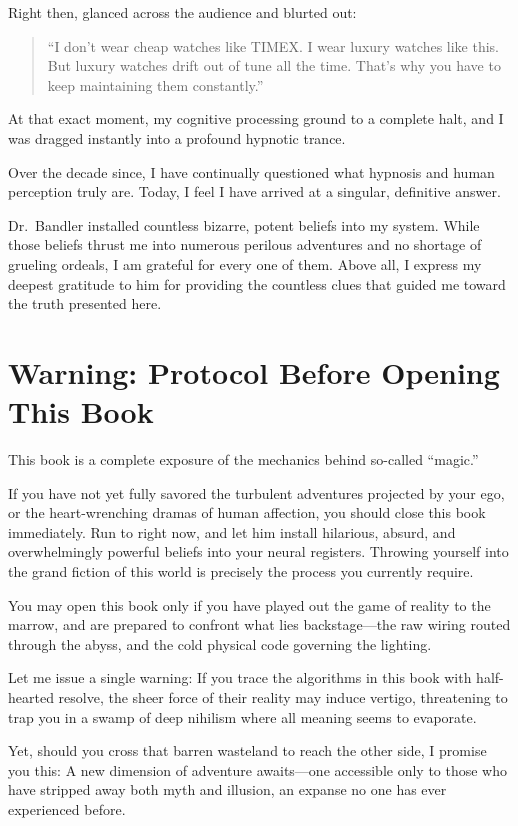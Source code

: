    Right then, \txtBandler glanced across the audience and blurted out:
    \begin{quote}
        ``I don't wear cheap watches like TIMEX. I wear luxury watches like this. But luxury watches drift out of tune all the time. That's why you have to keep maintaining them constantly.''
    \end{quote}

    At that exact moment, my cognitive processing ground to a complete halt, and I was dragged instantly into a profound hypnotic trance.

    Over the decade since, I have continually questioned what hypnosis and human perception truly are. Today, I feel I have arrived at a singular, definitive answer.

    Dr.~Bandler installed countless bizarre, potent beliefs into my system. While those beliefs thrust me into numerous perilous adventures and no shortage of grueling ordeals, I am grateful for every one of them. Above all, I express my deepest gratitude to him for providing the countless clues that guided me toward the truth presented here.

    \section*{Warning: Protocol Before Opening This Book}
    This book is a complete exposure of the mechanics behind so-called ``magic.''

    If you have not yet fully savored the turbulent adventures projected by your ego, or the heart-wrenching dramas of human affection, you should close this book immediately. Run to \fullBandler right now, and let him install hilarious, absurd, and overwhelmingly powerful beliefs into your neural registers. Throwing yourself into the grand fiction of this world is precisely the process you currently require.

    You may open this book only if you have played out the game of reality to the marrow, and are prepared to confront what lies backstage—the raw wiring routed through the abyss, and the cold physical code governing the lighting.

    Let me issue a single warning:
    If you trace the algorithms in this book with half-hearted resolve, the sheer force of their reality may induce vertigo, threatening to trap you in a swamp of deep nihilism where all meaning seems to evaporate.

    Yet, should you cross that barren wasteland to reach the other side, I promise you this:
    A new dimension of adventure awaits—one accessible only to those who have stripped away both myth and illusion, an expanse no one has ever experienced before.
\fi

